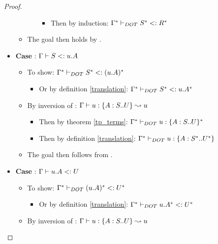 \begin{proof}
\begin{itemize}
\begin{itemize}
\begin{itemize}
\begin{itemize}
                    \item Then by induction:
                        $\Gamma^{*} \vdash_{DOT} S^{*} <: R^{*}$
                \end{itemize}
            \end{itemize}
            \item The goal then holds by .
        \end{itemize}
        \item \textbf{Case} : $\Gamma \vdash S <: u.A$
        \begin{itemize}
            \item To show: $\Gamma^{*} \vdash_{DOT} S^{*} <: (u.A)^{*}$
            \begin{itemize}
                \item Or by definition \ref{translation}:
                    $\Gamma^{*} \vdash_{DOT} S^{*} <: u.A^{*}$
            \end{itemize}
            \item By inversion of :
                $\Gamma \vdash u: \{A : S .. U\} \leadsto u$
            \begin{itemize}
                \item Then by theorem \ref{tp_terms}:
                    $\Gamma^{*} \vdash_{DOT} u: \{A : S .. U\}^{*}$
                \item Then by definition \ref{translation}:
                    $\Gamma^{*} \vdash_{DOT} u: \{A : S^{*} .. U^{*}\}$
            \end{itemize}
            \item The goal then follows from .
        \end{itemize}
        \item \textbf{Case} : $\Gamma \vdash u.A <: U$
        \begin{itemize}
            \item To show: $\Gamma^{*} \vdash_{DOT} (u.A)^{*} <: U^{*}$
            \begin{itemize}
                \item Or by definition \ref{translation}:
                    $\Gamma^{*} \vdash_{DOT} u.A^{*} <: U^{*}$
            \end{itemize}
            \item By inversion of :
                $\Gamma \vdash u: \{A : S .. U\} \leadsto u$
            \begin{itemize}

\end{itemize}
\end{itemize}
\end{itemize}
\end{proof}
